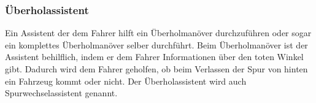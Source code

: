        \subsubsection{Überholassistent}
        Ein Assistent der dem Fahrer hilft ein Überholmanöver durchzuführen oder sogar ein
        komplettes Überholmanöver selber durchführt. Beim Überholmanöver ist der Assistent 
        behilflich, indem er dem Fahrer Informationen über den toten Winkel gibt. Dadurch 
        wird dem Fahrer geholfen, ob beim Verlassen der Spur von hinten ein Fahrzeug kommt 
        oder nicht. Der Überholassistent wird auch Spurwechselassistent genannt.
        \cite{ueberholassi.PB1} \cite{spurwechsel.PB1} \cite{assistenzsysteme.PB1} 
        \cite{assistenzsysteme.PB2}
